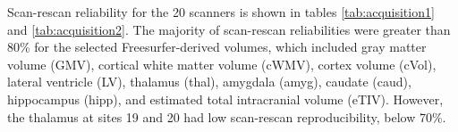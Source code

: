 Scan-rescan reliability for the 20 scanners is shown in tables \ref{tab:acquisition1} and \ref{tab:acquisition2}. The majority of scan-rescan reliabilities were greater than 80\% for the selected Freesurfer-derived volumes, which included gray matter volume (GMV), cortical white matter volume (cWMV), cortex volume (cVol), lateral ventricle (LV), thalamus (thal), amygdala (amyg), caudate (caud), hippocampus (hipp), and estimated total intracranial volume (eTIV). However, the thalamus at sites 19 and 20 had low scan-rescan reproducibility, below 70\%. %
